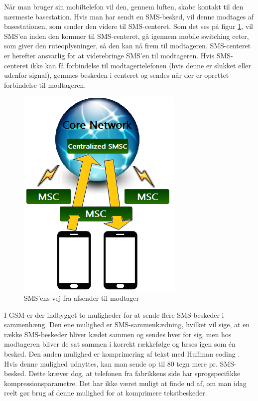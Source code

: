 Når man bruger sin mobiltelefon vil den, gennem luften, skabe kontakt til den nærmeste basestation. Hvis man har sendt en SMS-besked, vil denne modtages af basestationen, som sender den videre til SMS-centeret. Som det ses på figur \ref{GSM}, vil SMS'en inden den kommer til SMS-centeret, gå igennem mobile switching ceter, som giver den ruteoplysninger, så den kan nå frem til modtageren. SMS-centeret er herefter ansvarlig for at viderebringe SMS’en til modtageren. Hvis SMS-centeret ikke kan få forbindelse til modtagertelefonen (hvis denne er slukket eller udenfor signal), gemmes beskeden i centeret og sendes når der er oprettet forbindelse til modtageren. \cite{info}

\begin{figure}[H]
\centering
\includegraphics []{Billeder/GSMnetvaerk.png}
\caption {SMS'ens vej fra afsender til modtager \cite{info}}
\label {GSM}
\end{figure} 

I GSM er der indbygget to muligheder for at sende flere SMS-beskeder i sammenhæng. Den ene mulighed er SMS-sammenkædning, hvilket vil sige, at en række SMS-beskeder bliver kædet sammen og sendes hver for sig, men hos modtageren bliver de sat sammen i korrekt rækkefølge og læses igen som én besked. Den anden mulighed er komprimering af tekst med Huffman coding \cite{UNI}. Hvis denne mulighed udnyttes, kan man sende op til 80 tegn mere pr. SMS-besked. Dette kræver dog, at telefonen fra fabrikkens side har sprogspecifikke kompressionsparametre. Det har ikke været muligt at finde ud af, om man idag reelt gør brug af denne mulighed for at komprimere tekstbeskeder. 
